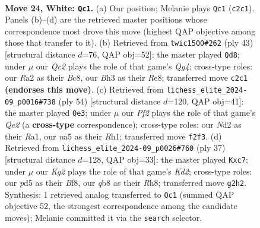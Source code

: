 \documentclass[11pt]{article}
\begin{document}
\clearpage

\begin{figure}[p]\centering
\begin{subfigure}{0.46\textwidth}\centering
\resizebox{\linewidth}{!}{%
\newchessgame
\chessboard[
  setfen={rqb1k2r/p3b1pp/1p6/n2p1p2/P2P3P/1p2P1nB/RBQN1PK1/1N2R3 w - - 0 24},
  showmover=false,
  pgfstyle=straightmove, color=movearrow, markmove={c2-c1}
]}
\caption{}
\end{subfigure}\hfill
\begin{subfigure}{0.46\textwidth}\centering
\resizebox{\linewidth}{!}{%
\newchessgame
\chessboard[
  setfen={r1b1r1k1/pp3pn1/2p5/3p2qn/3P1PNp/2NBP2P/PPQ3P1/R3R1K1 b - - 0 22},
  showmover=false,
  pgfstyle=straightmove, color=movearrow, markmove={g5-d8}
]}
\caption{}
\end{subfigure}
\\[4pt]
\begin{subfigure}{0.46\textwidth}\centering
\resizebox{\linewidth}{!}{%
\newchessgame
\chessboard[
  setfen={rn2r1k1/1p4b1/p2p2qp/P2P2p1/2pBP3/3n2PP/1PNKQ3/R5NR w - - 4 28},
  showmover=false,
  pgfstyle=straightmove, color=movearrow, markmove={e2-e3}
]}
\caption{}
\end{subfigure}\hfill
\begin{subfigure}{0.46\textwidth}\centering
\resizebox{\linewidth}{!}{%
\newchessgame
\chessboard[
  setfen={r4bnr/qpBk2p1/2n1p3/p2p1N2/P2P3p/7P/1P2B1P1/R2QNRK1 b - - 0 19},
  showmover=false,
  pgfstyle=straightmove, color=movearrow, markmove={d7-c7}
]}
\caption{}
\end{subfigure}
\caption{\textbf{Move 24, White: \texttt{Qc1}.} (a) Our position; Melanie plays \texttt{Qc1} (\texttt{c2c1}). Panels (b)--(d) are the retrieved master positions whose correspondence most drove this move (highest QAP objective among those that transfer to it). (b) Retrieved from \texttt{twic1500\#262} (ply 43) [structural distance $d$=76, QAP obj=52]: the master played \texttt{Qd8}; under $\mu$ our \emph{Qc2} plays the role of that game's \emph{Qg4}; cross-type roles: our \emph{R}a2 as their \emph{B}c8, our \emph{B}h3 as their \emph{R}e8; transferred move \texttt{c2c1} \textbf{(endorses this move)}. (c) Retrieved from \texttt{lichess\_elite\_2024-09\_p0016\#738} (ply 54) [structural distance $d$=120, QAP obj=41]: the master played \texttt{Qe3}; under $\mu$ our \emph{Pf2} plays the role of that game's \emph{Qe2} (a \textbf{cross-type} correspondence); cross-type roles: our \emph{N}d2 as their \emph{R}a1, our \emph{n}a5 as their \emph{R}h1; transferred move \texttt{f2f3}. (d) Retrieved from \texttt{lichess\_elite\_2024-09\_p0026\#760} (ply 37) [structural distance $d$=128, QAP obj=33]: the master played \texttt{Kxc7}; under $\mu$ our \emph{Kg2} plays the role of that game's \emph{Kd2}; cross-type roles: our \emph{p}d5 as their \emph{B}f8, our \emph{q}b8 as their \emph{R}h8; transferred move \texttt{g2h2}. Synthesis: 1 retrieved analog transferred to \texttt{Qc1} (summed QAP objective 52, the strongest correspondence among the candidate moves); Melanie committed it via the \texttt{search} selector.}
\label{fig:thought-m46}
\end{figure}
\end{document}
